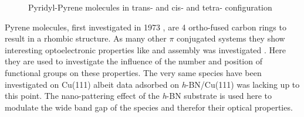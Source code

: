 \begin{figure}[h!]
	\begin{center}
	\end{center}
	\caption{Pyridyl-Pyrene molecules in trans-  and cis-  and tetra-  configuration}
	\label{fig:pyrene}
\end{figure}

Pyrene molecules, first investigated in 1973 \cite{khan_electronic_1973}, are 4 ortho-fused carbon rings to result in a rhombic structure. As many other $\pi$ conjugated systems they show interesting optoelectronic properties like \cite{crawford_experimental_2011, lee_enhanced_2012, feng_functionalization_2016, kurata_diarylamino-_2017, maeda_alkynylpyrenes_2006, kurata_diarylamino-_2017} and assembly was investigated \cite{pham_self-assembly_2014, matena_aggregation_2010, della_pia_anomalous_2014, pham_comparing_2016}. Here they are used to investigate the influence of the number and position of functional groups on these properties. The very same species have been investigated on Cu(111) albeit data adsorbed on \textit{h}-BN/Cu(111) was lacking up to this point. The nano-pattering effect of the \textit{h}-BN substrate is used here to modulate the wide band gap of the species and therefor their optical properties.

